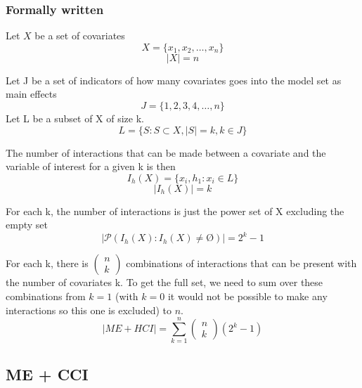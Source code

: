 \subsubsection{Formally written}
Let $X$ be a set of covariates 
\[X=\{\left.x_1,x_2,\dots ,x_n\right.\}\] 
\[|X|=n\] 

Let J be a set of indicators of how many covariates goes into the model set as main effects
\[J=\{\left.1,2,3,4,\dots ,n\right.\}\] 
Let L be a subset of X of size k.
\[L=\{\left.S:S\subset X,\left|S\right|=k,k\in J\right.\}\] 

The number of interactions that can be made between a covariate and the variable of interest for a given k is then
\[I_h\left(X\right)=\{\left.\left.x_i,h_1\right.:x_i\in L\right.\}\] 
\[\left|I_h\left(X\right)\right|=k\] 

For each k, the number of interactions is just the power set of X excluding the empty set
\[\left|\mathcal{P}\left(I_h\left(X\right):I_h\left(X\right)\neq \textrm{\O}\right)\right|=2^k-1\] 

For each k, there is $\left( \begin{array}{c}
n \\ 
k \end{array}
\right)$ combinations of interactions that can be present with the number of covariates k. To get the full set, we need to sum over these combinations from $k=1$ (with $k=0$ it would not be possible to make any interactions so this one is excluded) to $n$.
\[\left|ME+HCI\right|=\sum^n_{k=1}{\left( \begin{array}{c}
n \\ 
k \end{array}
\right)\left(2^k-1\right)}\] 
\textbf{}

\subsection{ME + CCI}

